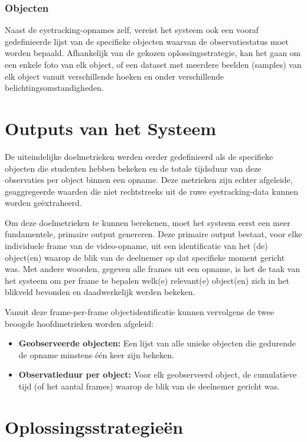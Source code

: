 \subsubsection{Objecten}

Naast de eyetracking-opnames zelf, vereist het systeem ook een vooraf gedefinieerde lijst van de specifieke objecten waarvan de observatiestatus moet worden bepaald.
Afhankelijk van de gekozen oplossingsstrategie, kan het gaan om een enkele foto van elk object, of een dataset met meerdere beelden (samples) van elk object vanuit verschillende hoeken en onder verschillende belichtingsomstandigheden.

\section{Outputs van het Systeem}

De uiteindelijke doelmetrieken werden eerder gedefinieerd als de specifieke objecten die studenten hebben bekeken en de totale 
tijdsduur van deze observaties per object binnen een opname. 
Deze metrieken zijn echter afgeleide, geaggregeerde waarden die niet rechtstreeks 
uit de ruwe eyetracking-data kunnen worden geëxtraheerd.

Om deze doelmetrieken te kunnen berekenen, moet het systeem eerst een meer fundamentele, primaire output genereren. 
Deze primaire output bestaat, voor elke individuele frame van de video-opname, uit een identificatie van het (de) object(en) 
waarop de blik van de deelnemer op dat specifieke moment gericht was. Met andere woorden, gegeven alle frames uit een opname, 
is het de taak van het systeem om per frame te bepalen welk(e) relevant(e) object(en) zich in het blikveld bevonden en daadwerkelijk werden bekeken.

Vanuit deze frame-per-frame objectidentificatie kunnen vervolgens de twee beoogde hoofdmetrieken worden afgeleid:
\begin{itemize}
    \item \textbf{Geobserveerde objecten:} Een lijst van alle unieke objecten die gedurende de opname minstens één keer zijn bekeken.
    \item \textbf{Observatieduur per object:} Voor elk geobserveerd object, de cumulatieve tijd (of het aantal frames) waarop de blik van de deelnemer gericht was.
\end{itemize}

\section{Oplossingsstrategieën}

